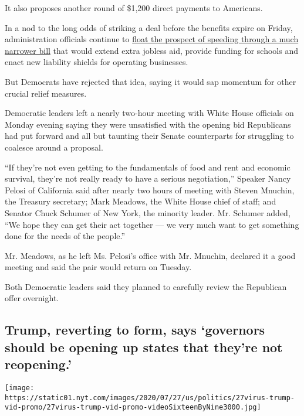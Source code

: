 It also proposes another round of \$1,200 direct payments to Americans.

In a nod to the long odds of striking a deal before the benefits expire
on Friday, administration officials continue to
\href{https://slack-redir.net/link?url=https\%3A\%2F\%2Fwww.nytimes.com\%2F2020\%2F07\%2F26\%2Fus\%2Fpolitics\%2Fcoronavirus-stimulus-bill-unemployment.html}{float
the prospect of speeding through a much narrower bill} that would extend
extra jobless aid, provide funding for schools and enact new liability
shields for operating businesses.

But Democrats have rejected that idea, saying it would sap momentum for
other crucial relief measures.

Democratic leaders left a nearly two-hour meeting with White House
officials on Monday evening saying they were unsatisfied with the
opening bid Republicans had put forward and all but taunting their
Senate counterparts for struggling to coalesce around a proposal.

``If they're not even getting to the fundamentals of food and rent and
economic survival, they're not really ready to have a serious
negotiation,'' Speaker Nancy Pelosi of California said after nearly two
hours of meeting with Steven Mnuchin, the Treasury secretary; Mark
Meadows, the White House chief of staff; and Senator Chuck Schumer of
New York, the minority leader. Mr. Schumer added, ``We hope they can get
their act together --- we very much want to get something done for the
needs of the people.''

Mr. Meadows, as he left Ms. Pelosi's office with Mr. Mnuchin, declared
it a good meeting and said the pair would return on Tuesday.

Both Democratic leaders said they planned to carefully review the
Republican offer overnight.

\hypertarget{trump-reverting-to-form-says-governors-should-be-opening-up-states-that-theyre-not-reopening}{%
\subsection{Trump, reverting to form, says `governors should be opening
up states that they're not
reopening.'}\label{trump-reverting-to-form-says-governors-should-be-opening-up-states-that-theyre-not-reopening}}

\texttt{[image: https://static01.nyt.com/images/2020/07/27/us/politics/27virus-trump-vid-promo/27virus-trump-vid-promo-videoSixteenByNine3000.jpg]}

